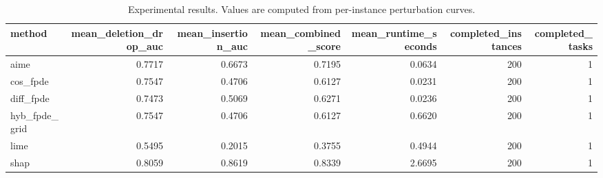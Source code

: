 \begin{table}[t]
\caption{Experimental results. Values are computed from per-instance perturbation curves.}
\label{tab:main_results_computed}
\centering
\begin{tabular}{lrrrrrr}
\toprule
method & mean\_deletion\_drop\_auc & mean\_insertion\_auc & mean\_combined\_score & mean\_runtime\_seconds & completed\_instances & completed\_tasks \\
\midrule
aime & 0.7717 & 0.6673 & 0.7195 & 0.0634 & 200 & 1 \\
cos\_fpde & 0.7547 & 0.4706 & 0.6127 & 0.0231 & 200 & 1 \\
diff\_fpde & 0.7473 & 0.5069 & 0.6271 & 0.0236 & 200 & 1 \\
hyb\_fpde\_grid & 0.7547 & 0.4706 & 0.6127 & 0.6620 & 200 & 1 \\
lime & 0.5495 & 0.2015 & 0.3755 & 0.4944 & 200 & 1 \\
shap & 0.8059 & 0.8619 & 0.8339 & 2.6695 & 200 & 1 \\
\bottomrule
\end{tabular}

\end{table}
